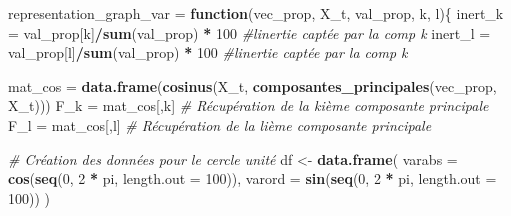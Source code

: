 \documentclass[
]{article}
\newenvironment{Shaded}{\begin{snugshade}}{\end{snugshade}}
\newcommand{\AttributeTok}[1]{\textcolor[rgb]{0.13,0.29,0.53}{#1}}
\newcommand{\CommentTok}[1]{\textcolor[rgb]{0.56,0.35,0.01}{\textit{#1}}}
\newcommand{\ControlFlowTok}[1]{\textcolor[rgb]{0.13,0.29,0.53}{\textbf{#1}}}
\newcommand{\DecValTok}[1]{\textcolor[rgb]{0.00,0.00,0.81}{#1}}
\newcommand{\FunctionTok}[1]{\textcolor[rgb]{0.13,0.29,0.53}{\textbf{#1}}}
\newcommand{\NormalTok}[1]{#1}
\newcommand{\OtherTok}[1]{\textcolor[rgb]{0.56,0.35,0.01}{#1}}
\newcommand{\SpecialCharTok}[1]{\textcolor[rgb]{0.81,0.36,0.00}{\textbf{#1}}}
\begin{document}
\begin{Shaded}
\begin{Highlighting}[]
\NormalTok{representation\_graph\_var }\OtherTok{=} \ControlFlowTok{function}\NormalTok{(vec\_prop, X\_t, val\_prop, k, l)\{}
\NormalTok{  inert\_k }\OtherTok{=}\NormalTok{ val\_prop[k]}\SpecialCharTok{/}\FunctionTok{sum}\NormalTok{(val\_prop) }\SpecialCharTok{*} \DecValTok{100} \CommentTok{\#l\textquotesingle{}inertie captée par la comp k}
\NormalTok{  inert\_l }\OtherTok{=}\NormalTok{ val\_prop[l]}\SpecialCharTok{/}\FunctionTok{sum}\NormalTok{(val\_prop) }\SpecialCharTok{*} \DecValTok{100} \CommentTok{\#l\textquotesingle{}inertie captée par la comp k}
  
\NormalTok{  mat\_cos }\OtherTok{=} \FunctionTok{data.frame}\NormalTok{(}\FunctionTok{cosinus}\NormalTok{(X\_t, }\FunctionTok{composantes\_principales}\NormalTok{(vec\_prop, X\_t)))}
\NormalTok{  F\_k }\OtherTok{=}\NormalTok{ mat\_cos[,k] }\CommentTok{\# Récupération de la kième composante principale}
\NormalTok{  F\_l }\OtherTok{=}\NormalTok{ mat\_cos[,l] }\CommentTok{\# Récupération de la lième composante principale}

  
  \CommentTok{\# Création des données pour le cercle unité}
\NormalTok{  df }\OtherTok{\textless{}{-}} \FunctionTok{data.frame}\NormalTok{(}
    \AttributeTok{varabs =} \FunctionTok{cos}\NormalTok{(}\FunctionTok{seq}\NormalTok{(}\DecValTok{0}\NormalTok{, }\DecValTok{2} \SpecialCharTok{*}\NormalTok{ pi, }\AttributeTok{length.out =} \DecValTok{100}\NormalTok{)),}
    \AttributeTok{varord =} \FunctionTok{sin}\NormalTok{(}\FunctionTok{seq}\NormalTok{(}\DecValTok{0}\NormalTok{, }\DecValTok{2} \SpecialCharTok{*}\NormalTok{ pi, }\AttributeTok{length.out =} \DecValTok{100}\NormalTok{))}
\NormalTok{  )}
  

\end{Highlighting}
\end{Shaded}
\end{document}
